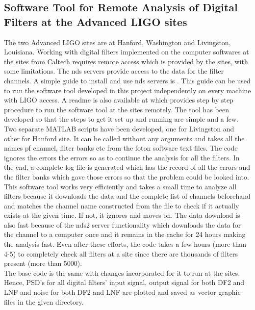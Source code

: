 \documentclass[colorlinks=true,pdfstartview=FitV,linkcolor=blue,
            citecolor=red,urlcolor=magenta]{ligodoc}
\begin{document}
	\subsection{Software Tool for Remote Analysis of Digital Filters at the Advanced LIGO sites}
	The two Advanced LIGO sites are at Hanford, Washington and Livingston, Louisiana. Working with digital filters implemented on the computer softwares at the sites from Caltech requires remote access which is provided by the sites, with some limitations. The nds servers provide access to the data for the filter channels. A simple guide to install and use nds servers is \cite{nds}. This guide can be used to run the software tool developed in this project independently on every machine with LIGO access. A readme is also available at \cite{git} which provides step by step procedure to run the software tool at the sites remotely. The tool has been developed so that the steps to get it set up and running are simple and a few. \\
	Two separate MATLAB scripts have been developed, one for Livingston and other for Hanford site. It can be called without any arguments and takes all the names pf channel, filter banks etc from the foton software text files. The code ignores the errors the errors so as to continue the analysis for all the filters. In the end, a complete log file is generated which has the record of all the errors and the filter banks which gave those errors so that the problem could be looked into. This software tool works very efficiently and takes a small time to analyze all filters because it downloads the data and the complete list of channels beforehand and matches the channel name constructed from the file to check if it actually exists at the given time. If not, it ignores and moves on. The data download is also fast because of the nds2 server functionality which downloads the data for the channel to a computer once and it remains in the cache for 24 hours making the analysis fast. Even after these efforts, the code takes a few hours (more than 4-5) to completely check all filters at a site since there are thousands of filters present (more than 5000). 
	\\The base code is the same with changes incorporated for it to run at the sites. Hence, PSD's for all digital filters' input signal, output signal for both DF2 and LNF and noise for both DF2 and LNF are plotted and saved as vector graphic files in the given directory. 
\end{document}
